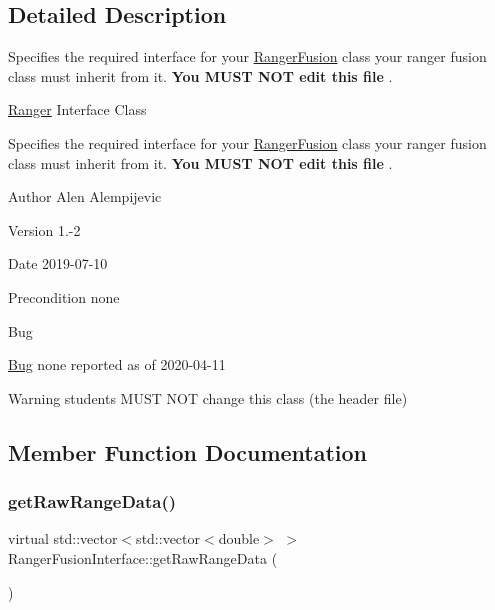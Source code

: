 \subsection{Detailed Description}
Specifies the required interface for your \hyperlink{classRangerFusion}{Ranger\+Fusion} class your ranger fusion class must inherit from it. {\bfseries  You M\+U\+ST N\+OT edit this file }. 

\hyperlink{classRanger}{Ranger} Interface Class

Specifies the required interface for your \hyperlink{classRangerFusion}{Ranger\+Fusion} class your ranger fusion class must inherit from it. {\bfseries  You M\+U\+ST N\+OT edit this file }. \begin{DoxyAuthor}{Author}
Alen Alempijevic 
\end{DoxyAuthor}
\begin{DoxyVersion}{Version}
1.-\/2 
\end{DoxyVersion}
\begin{DoxyDate}{Date}
2019-\/07-\/10 
\end{DoxyDate}
\begin{DoxyPrecond}{Precondition}
none 
\end{DoxyPrecond}
\begin{DoxyRefDesc}{Bug}
\item[\hyperlink{bug__bug000002}{Bug}]none reported as of 2020-\/04-\/11 \end{DoxyRefDesc}
\begin{DoxyWarning}{Warning}
students M\+U\+ST N\+OT change this class (the header file) 
\end{DoxyWarning}


\subsection{Member Function Documentation}
\mbox{\label{classRangerFusionInterface_a9d60ca5866261026b870d7c0171587f5}} 
\subsubsection{\texorpdfstring{get\+Raw\+Range\+Data()}{getRawRangeData()}}
{\footnotesize\ttfamily virtual std\+::vector$<$std\+::vector$<$double$>$ $>$ Ranger\+Fusion\+Interface\+::get\+Raw\+Range\+Data (\begin{DoxyParamCaption}{ }\end{DoxyParamCaption})\hspace{0.3cm}{\ttfamily [pure virtual]}}



